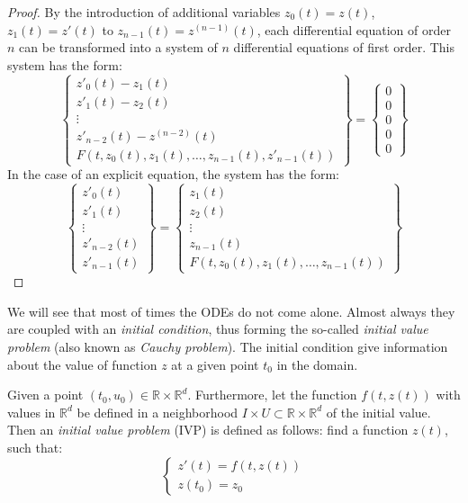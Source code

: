 \begin{proof}
  By the introduction of additional variables $z_0(t)=z(t)$,
  $z_1(t)=z'(t)$ to $z_{n-1}(t) = z^{(n-1)}(t)$,
  each differential equation of order $n$ can be transformed into a 
  system of $n$ differential equations of first order.
  This system has the form:
  \begin{equation}
		\begin{Bmatrix}
			z'_0(t) - z_1(t) \\
			z'_1(t) - z_2(t) \\
			\vdots \\
			z'_{n-2}(t) - z^{(n-2)}(t) \\
			F\left(t,z_0(t),z_1(t),\dots,z_{n-1}(t), z'_{n-1}(t)\right)
		\end{Bmatrix} = 
		\begin{Bmatrix}
			0 \\ 0 \\ 0 \\ 0 \\ 0
		\end{Bmatrix}
  \end{equation}
  In the case of an explicit equation, the system has the form:
  \begin{equation}
	\begin{Bmatrix}
		z'_0(t) \\
		z'_1(t) \\
		\vdots \\
		z'_{n-2}(t) \\
		z'_{n-1}(t)
	\end{Bmatrix} = 
	\begin{Bmatrix}
		z_1(t) \\
		z_2(t) \\
		\vdots \\
		z_{n-1}(t) \\
		F\left(t,z_0(t),z_1(t),\dots,z_{n-1}(t)\right)
	\end{Bmatrix}
  \end{equation}
\end{proof}

We will see that most of times the ODEs do not come alone.
Almost always they are coupled with an \textit{initial condition},
thus forming the so-called \textit{initial value problem}
(also known as \textit{Cauchy problem}).
The initial condition give information about the value
of function $z$ at a given point $t_0$ in the domain.

\begin{definition}
  Given a point $(t_0,u_0) \in \mathbb{R} \times \mathbb{R}^d$.
  Furthermore, let the function $f(t,z(t))$ with values in
  $\mathbb{R}^d$ be defined in a neighborhood
  $I \times U \subset \mathbb{R} \times \mathbb{R}^d$ of the initial value.
  Then an \textit{initial value problem} (IVP) is 
  defined as follows: find a function $z(t)$, such that:
  \begin{equation}
	\begin{cases}
	z'(t) = f(t,z(t)) \\
	z(t_0) = z_0
	\end{cases}
  \end{equation}
\end{definition}

